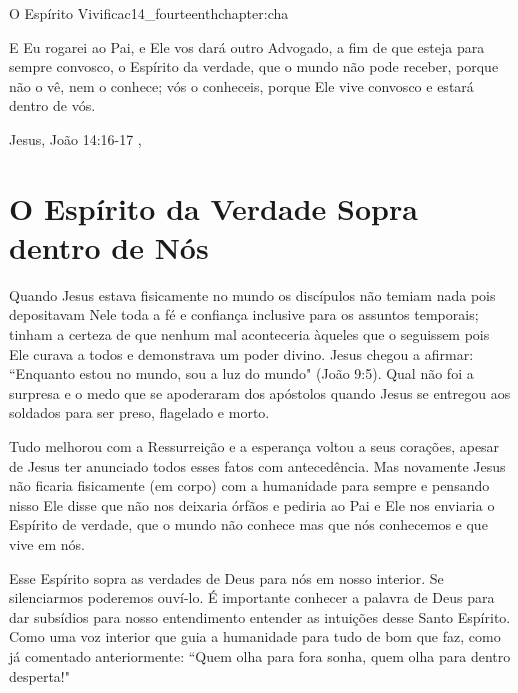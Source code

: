 \begin{chapterpage}{O Espírito Vivifica}{c14_fourteenthchapter:cha}

\begin{myquotation}E Eu rogarei ao Pai, e Ele vos dará outro Advogado, a fim de que esteja para sempre convosco, o Espírito da verdade, que o mundo não pode receber, porque não o vê, nem o conhece; vós o conheceis, porque Ele vive convosco e estará dentro de vós.
 
\par\vspace*{15mm}
\mbox{}\hfill \emdash{}Jesus, João 14:16-17 
, %
\par\end{myquotation}

\end{chapterpage}



\section{O Espírito da Verdade Sopra dentro de Nós}\label{c1_basicformatting:sec}

\emdash{}Quando Jesus estava fisicamente no mundo os discípulos não temiam nada pois depositavam Nele toda a fé e confiança inclusive para os assuntos temporais; tinham a certeza de que nenhum mal aconteceria àqueles que o seguissem pois Ele curava a todos e demonstrava um poder divino. Jesus chegou a afirmar: ``Enquanto estou no mundo, sou a luz do mundo" (João 9:5). Qual não foi a surpresa e o medo que se apoderaram dos apóstolos quando Jesus se entregou aos soldados para ser preso, flagelado e morto.

\emdash{}Tudo melhorou com a Ressurreição e a esperança voltou a seus corações, apesar de Jesus ter anunciado todos esses fatos com antecedência. Mas novamente Jesus não ficaria fisicamente (em corpo) com a humanidade para sempre e pensando nisso Ele disse que não nos deixaria órfãos e pediria ao Pai e Ele nos enviaria o Espírito de verdade, que o mundo não conhece mas que nós conhecemos e que vive em nós.

\emdash{}Esse Espírito sopra as verdades de Deus para nós em nosso interior. Se silenciarmos poderemos ouví-lo. É importante conhecer a palavra de Deus para dar subsídios para nosso entendimento entender as intuições desse Santo Espírito. Como uma voz interior que guia a humanidade para tudo de bom que faz, como já comentado anteriormente: ``Quem olha para fora sonha, quem olha para dentro desperta!"

